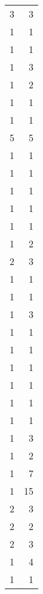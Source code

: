 \begin{tabular}{rr}
                  3 &             3 \\
                  1 &             1 \\
                  1 &             1 \\
                  1 &             3 \\
                  1 &             2 \\
                  1 &             1 \\
                  1 &             1 \\
                  5 &             5 \\
                  1 &             1 \\
                  1 &             1 \\
                  1 &             1 \\
                  1 &             1 \\
                  1 &             1 \\
                  1 &             2 \\
                  2 &             3 \\
                  1 &             1 \\
                  1 &             1 \\
                  1 &             3 \\
                  1 &             1 \\
                  1 &             1 \\
                  1 &             1 \\
                  1 &             1 \\
                  1 &             1 \\
                  1 &             1 \\
                  1 &             3 \\
                  1 &             2 \\
                  1 &             7 \\
                  1 &            15 \\
                  2 &             3 \\
                  2 &             2 \\
                  2 &             3 \\
                  1 &             4 \\
                  1 &             1 \\

\end{tabular}

